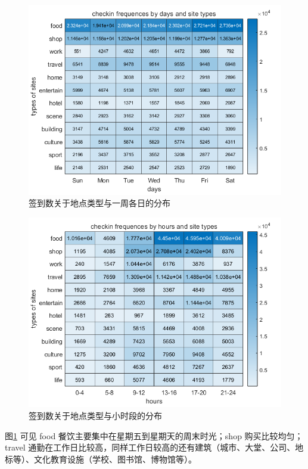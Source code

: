 \documentclass[UTF8]{ctexart}
\begin{document}
		\begin{figure}[h]
			\centering
			\includegraphics[scale=0.6]{day_sitetype_l.png}
			\caption{签到数关于地点类型与一周各日的分布}
			\label{day_ven}
		\end{figure}
		\begin{figure}[h]
			\centering
			\includegraphics[scale=0.6]{hour_sitetype_l.png}
			\caption{签到数关于地点类型与小时段的分布}
			\label{hour_ven}
		\end{figure}
		
		图\ref{day_ven} 可见 food 餐饮主要集中在星期五到星期天的周末时光；shop 购买比较均匀；travel 通勤在工作日比较高，同样工作日较高的还有建筑（城市、大堂、公司、地标等）、文化教育设施（学校、图书馆、博物馆等）。
		
\end{document}
